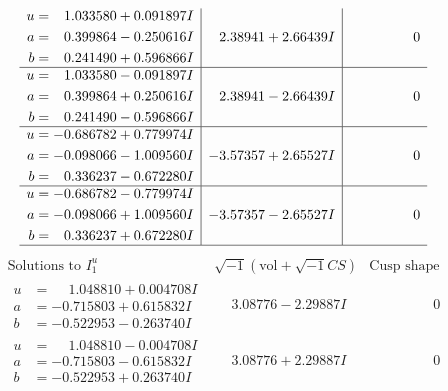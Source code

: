 \documentclass[1p]{elsarticle_modified}
\theoremstyle{definition}
\newcommand{\I}{\sqrt{-1}}
\begin{document}
$$\begin{array}{c|c|c}
\begin{aligned}
u &= \phantom{-}1.033580 + 0.091897 I \\
a &= \phantom{-}0.399864 - 0.250616 I \\
b &= \phantom{-}0.241490 + 0.596866 I\end{aligned}
 & \phantom{-}2.38941 + 2.66439 I & \phantom{-0.000000 } 0 \\ \hline\begin{aligned}
u &= \phantom{-}1.033580 - 0.091897 I \\
a &= \phantom{-}0.399864 + 0.250616 I \\
b &= \phantom{-}0.241490 - 0.596866 I\end{aligned}
 & \phantom{-}2.38941 - 2.66439 I & \phantom{-0.000000 } 0 \\ \hline\begin{aligned}
u &= -0.686782 + 0.779974 I \\
a &= -0.098066 - 1.009560 I \\
b &= \phantom{-}0.336237 - 0.672280 I\end{aligned}
 & -3.57357 + 2.65527 I & \phantom{-0.000000 } 0 \\ \hline\begin{aligned}
u &= -0.686782 - 0.779974 I \\
a &= -0.098066 + 1.009560 I \\
b &= \phantom{-}0.336237 + 0.672280 I\end{aligned}
 & -3.57357 - 2.65527 I & \phantom{-0.000000 } 0\\
 \hline 
 \end{array}$$\newpage$$\begin{array}{c|c|c}  
\text{Solutions to }I^u_{1}& \I (\text{vol} + \sqrt{-1}CS) & \text{Cusp shape}\\
 \hline 
\begin{aligned}
u &= \phantom{-}1.048810 + 0.004708 I \\
a &= -0.715803 + 0.615832 I \\
b &= -0.522953 - 0.263740 I\end{aligned}
 & \phantom{-}3.08776 - 2.29887 I & \phantom{-0.000000 } 0 \\ \hline\begin{aligned}
u &= \phantom{-}1.048810 - 0.004708 I \\
a &= -0.715803 - 0.615832 I \\
b &= -0.522953 + 0.263740 I\end{aligned}
 & \phantom{-}3.08776 + 2.29887 I & \phantom{-0.000000 } 0 \\ \hline\begin{aligned}

\end{aligned}
\end{array}$$
\end{document}
